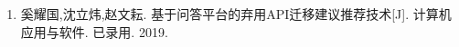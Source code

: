 \begin{enumerate}
    \renewcommand{\labelenumi}{[\theenumi]}
    \item 奚耀国,沈立炜,赵文耘. 基于问答平台的弃用API迁移建议推荐技术[J]. 计算机应用与软件. 已录用. 2019.
\end{enumerate}
